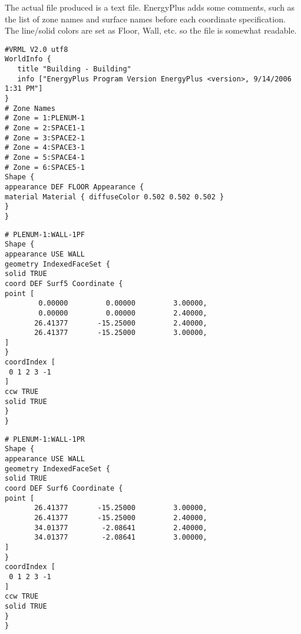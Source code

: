 The actual file produced is a text file. EnergyPlus adds some comments, such as the list of zone names and surface names before each coordinate specification. The line/solid colors are set as Floor, Wall, etc. so the file is somewhat readable.

\begin{lstlisting}
#VRML V2.0 utf8
WorldInfo {
   title "Building - Building"
   info ["EnergyPlus Program Version EnergyPlus <version>, 9/14/2006 1:31 PM"]
}
# Zone Names
# Zone = 1:PLENUM-1
# Zone = 2:SPACE1-1
# Zone = 3:SPACE2-1
# Zone = 4:SPACE3-1
# Zone = 5:SPACE4-1
# Zone = 6:SPACE5-1
Shape {
appearance DEF FLOOR Appearance {
material Material { diffuseColor 0.502 0.502 0.502 }
}
}
\end{lstlisting}

\begin{lstlisting}
# PLENUM-1:WALL-1PF
Shape {
appearance USE WALL
geometry IndexedFaceSet {
solid TRUE
coord DEF Surf5 Coordinate {
point [
        0.00000         0.00000         3.00000,
        0.00000         0.00000         2.40000,
       26.41377       -15.25000         2.40000,
       26.41377       -15.25000         3.00000,
]
}
coordIndex [
 0 1 2 3 -1
]
ccw TRUE
solid TRUE
}
}
\end{lstlisting}

\begin{lstlisting}
# PLENUM-1:WALL-1PR
Shape {
appearance USE WALL
geometry IndexedFaceSet {
solid TRUE
coord DEF Surf6 Coordinate {
point [
       26.41377       -15.25000         3.00000,
       26.41377       -15.25000         2.40000,
       34.01377        -2.08641         2.40000,
       34.01377        -2.08641         3.00000,
]
}
coordIndex [
 0 1 2 3 -1
]
ccw TRUE
solid TRUE
}
}
\end{lstlisting}
